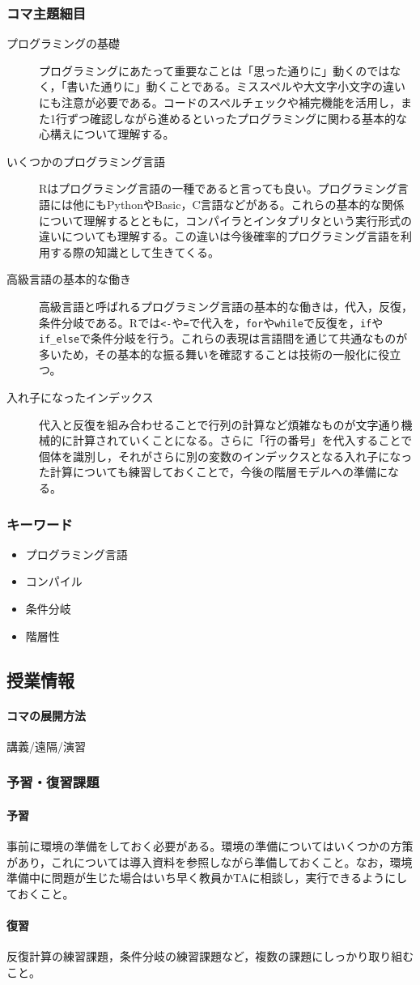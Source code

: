 \subsubsection{コマ主題細目}
\begin{description}
    \item[プログラミングの基礎] プログラミングにあたって重要なことは「思った通りに」動くのではなく，「書いた通りに」動くことである。ミススペルや大文字小文字の違いにも注意が必要である。コードのスペルチェックや補完機能を活用し，また1行ずつ確認しながら進めるといったプログラミングに関わる基本的な心構えについて理解する。

    \item[いくつかのプログラミング言語] Rはプログラミング言語の一種であると言っても良い。プログラミング言語には他にもPythonやBasic，C言語などがある。これらの基本的な関係について理解するとともに，コンパイラとインタプリタという実行形式の違いについても理解する。この違いは今後確率的プログラミング言語を利用する際の知識として生きてくる。

    \item[高級言語の基本的な働き]高級言語と呼ばれるプログラミング言語の基本的な働きは，代入，反復，条件分岐である。Rでは\verb|<-|や\verb|=|で代入を，\verb|for|や\verb|while|で反復を，\verb|if|や\verb|if_else|で条件分岐を行う。これらの表現は言語間を通じて共通なものが多いため，その基本的な振る舞いを確認することは技術の一般化に役立つ。

    \item[入れ子になったインデックス] 代入と反復を組み合わせることで行列の計算など煩雑なものが文字通り機械的に計算されていくことになる。さらに「行の番号」を代入することで個体を識別し，それがさらに別の変数のインデックスとなる入れ子になった計算についても練習しておくことで，今後の階層モデルへの準備になる。

\end{description}
\subsubsection{キーワード}
\begin{itemize}
    \item プログラミング言語
    \item コンパイル
    \item 条件分岐
    \item 階層性
\end{itemize}
\subsection{授業情報}
\paragraph{コマの展開方法}
講義/遠隔/演習
\subsubsection{予習・復習課題}
\paragraph{予習}事前に環境の準備をしておく必要がある。環境の準備についてはいくつかの方策があり，これについては導入資料を参照しながら準備しておくこと。なお，環境準備中に問題が生じた場合はいち早く教員かTAに相談し，実行できるようにしておくこと。
\paragraph{復習}反復計算の練習課題，条件分岐の練習課題など，複数の課題にしっかり取り組むこと。